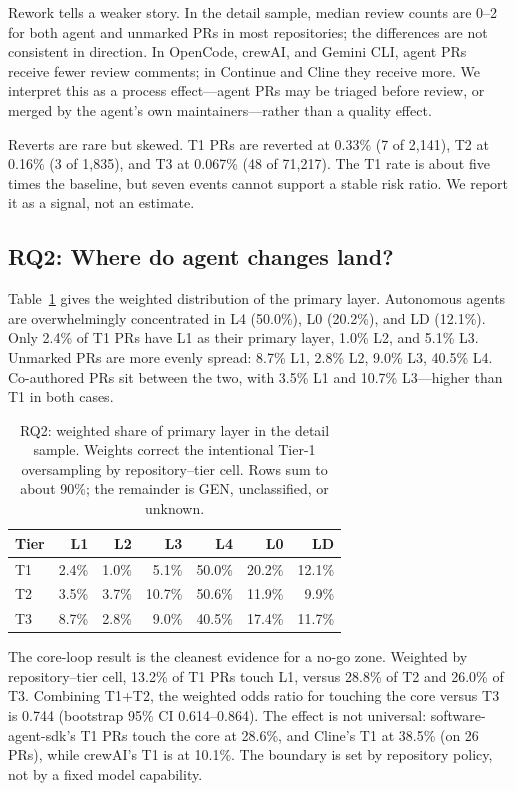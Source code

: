 \documentclass[sigconf,review]{acmart}
\begin{document}
Rework tells a weaker story. In the detail sample, median review counts are 0--2 for both agent and unmarked PRs in most repositories; the differences are not consistent in direction. In OpenCode, crewAI, and Gemini CLI, agent PRs receive fewer review comments; in Continue and Cline they receive more. We interpret this as a process effect---agent PRs may be triaged before review, or merged by the agent's own maintainers---rather than a quality effect.

Reverts are rare but skewed. T1 PRs are reverted at 0.33\% (7 of 2,141), T2 at 0.16\% (3 of 1,835), and T3 at 0.067\% (48 of 71,217). The T1 rate is about five times the baseline, but seven events cannot support a stable risk ratio. We report it as a signal, not an estimate.

\subsection{RQ2: Where do agent changes land?}

Table~\ref{tab:layers-dist} gives the weighted distribution of the primary layer. Autonomous agents are overwhelmingly concentrated in L4 (50.0\%), L0 (20.2\%), and LD (12.1\%). Only 2.4\% of T1 PRs have L1 as their primary layer, 1.0\% L2, and 5.1\% L3. Unmarked PRs are more evenly spread: 8.7\% L1, 2.8\% L2, 9.0\% L3, 40.5\% L4. Co-authored PRs sit between the two, with 3.5\% L1 and 10.7\% L3---higher than T1 in both cases.

\begin{table}[t]
\centering
\small
\caption{RQ2: weighted share of primary layer in the detail sample. Weights correct the intentional Tier-1 oversampling by repository--tier cell. Rows sum to about 90\%; the remainder is GEN, unclassified, or unknown.}
\label{tab:layers-dist}
\begin{tabular}{@{}lrrrrrr@{}}
\toprule
Tier & L1 & L2 & L3 & L4 & L0 & LD \\
\midrule
T1 & 2.4\% & 1.0\% & 5.1\% & 50.0\% & 20.2\% & 12.1\% \\
T2 & 3.5\% & 3.7\% & 10.7\% & 50.6\% & 11.9\% & 9.9\% \\
T3 & 8.7\% & 2.8\% & 9.0\% & 40.5\% & 17.4\% & 11.7\% \\
\bottomrule
\end{tabular}
\end{table}

The core-loop result is the cleanest evidence for a no-go zone. Weighted by repository--tier cell, 13.2\% of T1 PRs touch L1, versus 28.8\% of T2 and 26.0\% of T3. Combining T1+T2, the weighted odds ratio for touching the core versus T3 is 0.744 (bootstrap 95\% CI 0.614--0.864). The effect is not universal: software-agent-sdk's T1 PRs touch the core at 28.6\%, and Cline's T1 at 38.5\% (on 26 PRs), while crewAI's T1 is at 10.1\%. The boundary is set by repository policy, not by a fixed model capability.
\end{document}
